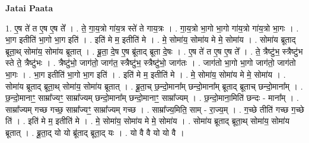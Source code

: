 \documentclass[17pt]{extarticle}
\begin{document}
\textbf{Jatai Paata} \newline

1. ए॒ष ते॑ त ए॒ष ए॒ष ते᳚ । . ते॒ गा॒य॒त्रो गा॑य॒त्र स्ते॑ ते गाय॒त्रः । . गा॒य॒त्रो भा॒गो भा॒गो गा॑य॒त्रो गा॑य॒त्रो भा॒गः । . भा॒ग इतीति॑ भा॒गो भा॒ग इति॑ । . इति॑ मे म॒ इतीति॑ मे । . मे॒ सोमा॑य॒ सोमा॑य मे मे॒ सोमा॑य । . सोमा॑य ब्रूताद् ब्रूता॒थ् सोमा॑य॒ सोमा॑य ब्रूतात् । . ब्रू॒ता॒ दे॒ष ए॒ष ब्रू॑ताद् ब्रूता दे॒षः । . ए॒ष ते॑ त ए॒ष ए॒ष ते᳚ । . ते॒ त्रैष्टु॑भ॒ स्त्रैष्टु॑भ स्ते ते॒ त्रैष्टु॑भः । . त्रैष्टु॑भो॒ जाग॑तो॒ जाग॑त॒ स्त्रैष्टु॑भ॒ स्त्रैष्टु॑भो॒ जाग॑तः । . जाग॑तो भा॒गो भा॒गो जाग॑तो॒ जाग॑तो भा॒गः । . भा॒ग इतीति॑ भा॒गो भा॒ग इति॑ । . इति॑ मे म॒ इतीति॑ मे । . मे॒ सोमा॑य॒ सोमा॑य मे मे॒ सोमा॑य । . सोमा॑य ब्रूताद् ब्रूता॒थ् सोमा॑य॒ सोमा॑य ब्रूतात् । . ब्रू॒ता॒च् छ॒न्दो॒माना᳚म् छन्दो॒माना᳚म् ब्रूताद् ब्रूताच् छन्दो॒माना᳚म् । . छ॒न्दो॒मानाꣳ॒॒ साम्रा᳚ज्यꣳ॒॒ साम्रा᳚ज्यम् छन्दो॒माना᳚म् छन्दो॒मानाꣳ॒॒ साम्रा᳚ज्यम् । . छ॒न्दो॒माना॒मिति॑ छन्दः - माना᳚म् । . साम्रा᳚ज्यम् गच्छ गच्छ॒ साम्रा᳚ज्यꣳ॒॒ साम्रा᳚ज्यम् गच्छ । . साम्रा᳚ज्य॒मिति॒ साम् - रा॒ज्य॒म् । . ग॒च्छे तीति॑ गच्छ ग॒च्छे ति॑ । . इति॑ मे म॒ इतीति॑ मे । . मे॒ सोमा॑य॒ सोमा॑य मे मे॒ सोमा॑य । . सोमा॑य ब्रूताद् ब्रूता॒थ् सोमा॑य॒ सोमा॑य ब्रूतात् । . ब्रू॒ता॒द् यो यो ब्रू॑ताद् ब्रूता॒द् यः । . यो वै वै यो यो वै । \newline
\end{document}
